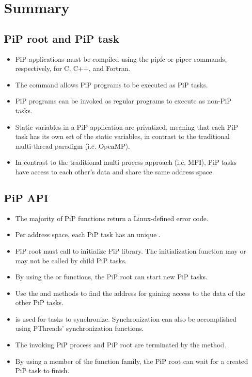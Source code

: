 
\section{Summary}

\subsection*{PiP root and PiP task}

\begin{itemize}
\item PiP applications must be compiled using the pipfc or pipcc
  commands, respectively, for C, C++, and Fortran.
\item The  command allows PiP programs to be executed as PiP
  tasks.
\item PiP programs can be invoked as regular programs to execute as
  non-PiP tasks.
\item Static variables in a PiP application are privatized, meaning
  that each PiP task has its own set of the static variables, in
  contrast to the traditional multi-thread paradigm (i.e. OpenMP).
\item In contrast to the traditional multi-process approach
  (i.e. MPI), PiP tasks have access to each other's data and share
  the same address space.
\end{itemize}

\subsection*{PiP API}

\begin{itemize}
\item The majority of PiP functions return a Linux-defined error code.
\item Per address space, each PiP task has an unique {\PIPID}.
\item PiP root must call  to initialize PiP library. The
  initialization function may or may not be called by child PiP tasks.
\item By using the  or
   functions, the PiP root can start new PiP
  tasks. 
\item Use the  and
   methods to find the address for gaining
  access to the data of the other PiP tasks.
\item {} is used for tasks to
  synchronize. Synchronization can also be accomplished using
  PThreads' synchronization functions. 
\item The invoking PiP process and PiP root are terminated by the
   method. 
\item By using a member of the  function family, the PiP
  root can wait for a created PiP task to finish.
\end{itemize}
 

